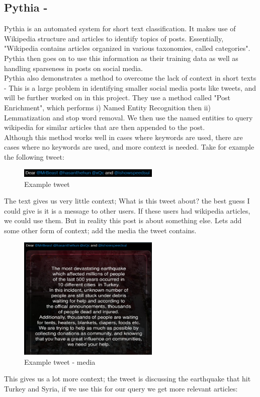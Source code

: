 \subsection{Pythia - \cite{Pythia}}
\label{sec:pythia}
Pythia is an automated system for short text classification. It makes use of Wikipedia structure and articles to identify
topics of posts.
Essentially, "Wikipedia contains articles organized in various taxonomies, called categories". Pythia then goes on to use
this information as their training data as well as handling sparseness in posts on social media.\\

Pythia also demonstrates a method to overcome the lack of context in short texts - This is a large problem in identifying
smaller social media posts like tweets, and will be further worked on in this project. They use a method called "Post Enrichment",
which performs i) Named Entity Recognition then ii) Lemmatization and stop word removal. We then use the named entities to query
wikipedia for similar articles that are then appended to the post.\\

Although this method works well in cases where keywords are used, there are cases where no keywords are used, and more context
is needed. Take for example the following tweet:
\newpage
\begin{figure}[htbp]
    \centering
    \includegraphics[width=0.6\textwidth]{../images/tweet-example2.png}
    \caption{Example tweet}
    \label{fig:tweet-example}
\end{figure}

The text gives us very little context; What is this tweet about? the best guess I could give
is it is a message to other users. If these users had wikipedia articles, we could use them. But in reality this post is about something else.
Lets add some other form of context; add the media the tweet contains.
\begin{figure}
    \centering
    \includegraphics[width=0.6\textwidth]{../images/tweet-media.png}
    \caption{Example tweet - media}
    \label{fig:tweet-media}
\end{figure}
This gives us a lot more context; the tweet is discussing the earthquake that hit Turkey and Syria, if we use this for our query we get more relevant
articles:
\newpage

